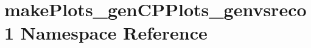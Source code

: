\hypertarget{namespacemakePlots__genCPPlots__genvsreco1}{
\section{makePlots\_\-genCPPlots\_\-genvsreco1 Namespace Reference}
\label{namespacemakePlots__genCPPlots__genvsreco1}
}
